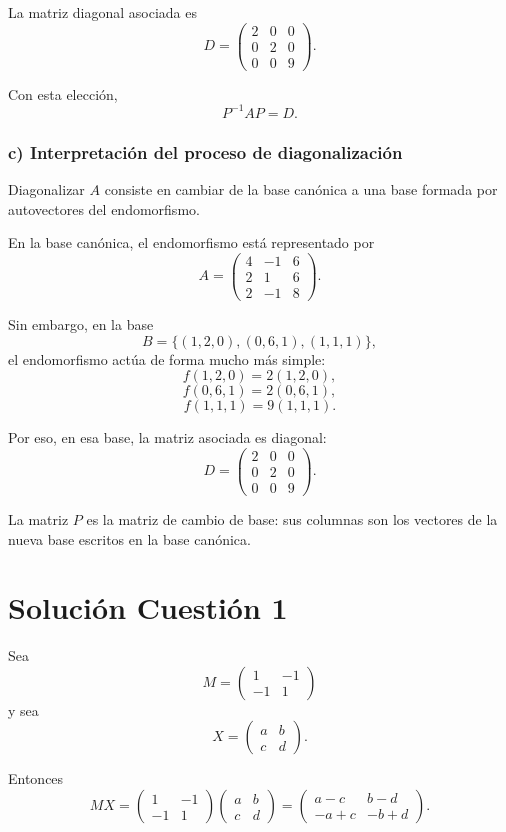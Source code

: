\documentclass[12pt]{article}
\begin{document}
La matriz diagonal asociada es
\[
D=
\begin{pmatrix}
2&0&0\\
0&2&0\\
0&0&9
\end{pmatrix}.
\]

Con esta elección,
\[
\boxed{
P^{-1}AP=D.
}
\]

\subsubsection*{c) Interpretación del proceso de diagonalización}

Diagonalizar \(A\) consiste en cambiar de la base canónica a una base formada por autovectores del endomorfismo.

En la base canónica, el endomorfismo está representado por
\[
A=
\begin{pmatrix}
4&-1&6\\
2&1&6\\
2&-1&8
\end{pmatrix}.
\]

Sin embargo, en la base
\[
B=\{(1,2,0),(0,6,1),(1,1,1)\},
\]
el endomorfismo actúa de forma mucho más simple:
\[
f(1,2,0)=2(1,2,0),
\]
\[
f(0,6,1)=2(0,6,1),
\]
\[
f(1,1,1)=9(1,1,1).
\]

Por eso, en esa base, la matriz asociada es diagonal:
\[
D=
\begin{pmatrix}
2&0&0\\
0&2&0\\
0&0&9
\end{pmatrix}.
\]

La matriz \(P\) es la matriz de cambio de base: sus columnas son los vectores de la nueva base escritos en la base canónica.

\section*{Solución Cuestión 1}

Sea
\[
M=
\begin{pmatrix}
1&-1\\
-1&1
\end{pmatrix}
\]
y sea
\[
X=
\begin{pmatrix}
a&b\\
c&d
\end{pmatrix}.
\]

Entonces
\[
MX=
\begin{pmatrix}
1&-1\\
-1&1
\end{pmatrix}
\begin{pmatrix}
a&b\\
c&d
\end{pmatrix}
=
\begin{pmatrix}
a-c&b-d\\
-a+c&-b+d
\end{pmatrix}.
\]
\end{document}
